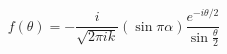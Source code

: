 \begin{equation}
f(\theta) = - \frac{i}{\sqrt{2\pi ik}} (\sin \pi\alpha) \frac{e^{-i
\theta/2}}{\sin \frac{\theta}{2}}
\end{equation}

